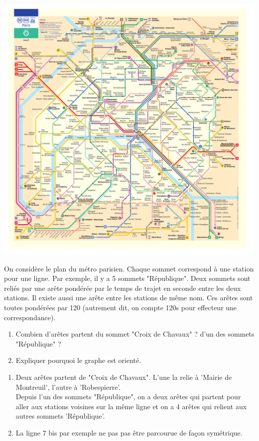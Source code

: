 \begin{center}
\includegraphics[scale=0.3]{metro/Plan.pdf}
\end{center}
On considère le plan du métro parisien. Chaque sommet correspond à une station pour une ligne. Par exemple, il y a 5 sommets "République". Deux sommets sont reliés par une arête pondérée par le temps de trajet en seconde entre les deux stations. Il existe aussi une arête entre les stations de même nom. Ces arêtes sont toutes pondérées par 120 (autrement dit, on compte 120s pour effecteur une correspondance).

\begin{exercice}
\begin{enumerate}
\item Combien d'arêtes partent du sommet "Croix de Chavaux" ? d'un des sommets "République" ?
\item Expliquer pourquoi le graphe est orienté.
\end{enumerate}
\end{exercice}

\begin{solution}
\begin{enumerate}
\item Deux arêtes partent de "Croix de Chavaux". L'une la relie à 'Mairie de Montreuil', l'autre à 'Robespierre'.\\
Depuis l'un des sommets "République", on a deux arêtes qui partent pour aller aux stations voisines sur la même ligne et on a 4 arêtes qui relient aux autres sommets 'République'.
\item La ligne 7 bis par exemple ne pas pas être parcourue de façon symétrique.
\end{enumerate}
\end{solution}


